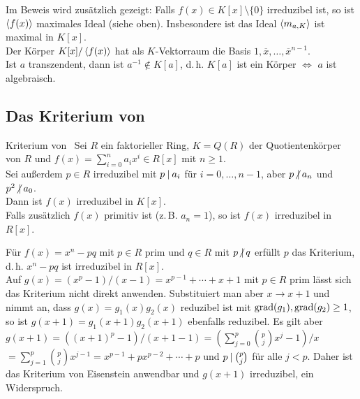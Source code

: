 \begin{Bem}
    Im Beweis wird zusätzlich gezeigt:
    Falls $f(x) \in K[x] \setminus \{0\}$ irreduzibel ist,
    so ist $\left\langle f(x)\right\rangle$ maximales Ideal (siehe oben).
    Insbesondere ist das Ideal $\left\langle m_{a,K}\right\rangle$ ist maximal in $K[x]$.\\
    Der Körper $K[x]/\left\langle f(x)\right\rangle$ hat als $K$-Vektorraum die Basis
    $1, \overline{x}, \dotsc, \overline{x}^{n-1}$.\\
    Ist $a$ transzendent, dann ist $a^{-1} \notin K[a]$, d.\,h.
    $K[a]$ ist ein Körper $\iff$ $a$ ist algebraisch.
\end{Bem}

\pagebreak

\subsection{%
    Das Kriterium von %
}

\begin{Theorem}{Kriterium von \upshape\,\!}
    Sei $R$ ein faktorieller Ring,
    $K = Q(R)$ der Quotientenkörper von $R$ und
    $f(x) = \sum_{i=0}^n a_i x^i \in R[x]$ mit $n \ge 1$.\\
    Sei außerdem $p \in R$ irreduzibel mit $p \mathbin{|} a_i$ für
    $i = 0, \dotsc, n - 1$, aber
    $p \mathbin{\!\not|} a_n$ und $p^2 \mathbin{\!\not|} a_0$.\\
    Dann ist $f(x)$ irreduzibel in $K[x]$.\\
    Falls zusätzlich $f(x)$ primitiv ist (z.\,B. $a_n = 1$), so ist
    $f(x)$ irreduzibel in $R[x]$.
\end{Theorem}

\begin{Bsp}
    Für $f(x) = x^n - pq$ mit $p \in R$ prim und $q \in R$ mit $p \mathbin{\!\not|} q$
    erfüllt $p$ das Kriterium, d.\,h. $x^n - pq$ ist irreduzibel in $R[x]$.\\
    Auf $g(x) = (x^p - 1)/(x - 1) = x^{p-1} + \dotsb + x + 1$
    mit $p \in R$ prim lässt sich das Kriterium nicht direkt anwenden.
    Substituiert man aber $x \rightarrow x + 1$ und nimmt an, dass
    $g(x) = g_1(x) g_2(x)$ reduzibel ist mit $\operatorname{grad}(g_1), \operatorname{grad}(g_2) \ge 1$,
    so ist $g(x + 1) = g_1(x + 1) g_2(x + 1)$ ebenfalls reduzibel.
    Es gilt aber $g(x + 1) = ((x + 1)^p - 1) / (x + 1 - 1) =
    \left(\sum_{j=0}^p \binom{p}{j} x^j - 1\right) / x$\\
    $= \sum_{j=1}^p \binom{p}{j} x^{j-1} =
    x^{p-1} + p x^{p-2} + \dotsb + p$
    und $p \mathbin{|} \binom{p}{j}$ für alle $j < p$.
    Daher ist das Kriterium von Eisenstein anwendbar und $g(x + 1)$
    irreduzibel, ein Widerspruch.
\end{Bsp}

